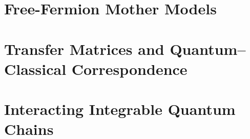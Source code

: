 \documentclass[12pt,openany]{book}
\theoremstyle{definition}
\theoremstyle{plain}
\begin{document}














\part{Free-Fermion Mother Models}











\part{Transfer Matrices and Quantum--Classical Correspondence}









\part{Interacting Integrable Quantum Chains}
\end{document}
